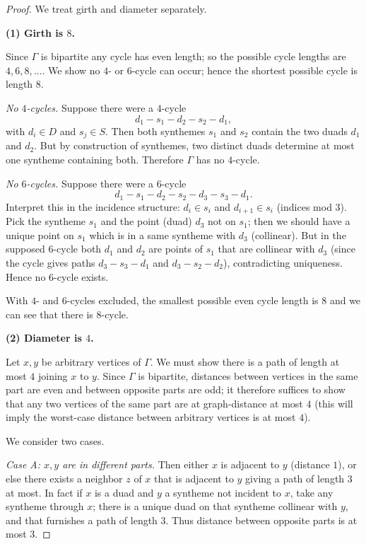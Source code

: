 \documentclass[12pt,a4paper,openany]{book}
\begin{document}
\begin{proof}
We treat girth and diameter separately.

\medskip\noindent\textbf{(1) Girth is $8$.}

Since $\Gamma$ is bipartite any cycle has even length; so the possible cycle lengths are $4,6,8,\dots$.
We show no $4$- or $6$-cycle can occur; hence the shortest possible cycle is length $8$.

\emph{No $4$-cycles.}  Suppose there were a $4$-cycle
\[
d_1 - s_1 - d_2 - s_2 - d_1,
\]
with $d_i\in D$ and $s_j\in S$. Then both synthemes $s_1$ and $s_2$ contain the two duads $d_1$ and $d_2$.  But by construction of synthemes, two distinct duads determine at most one syntheme containing both. Therefore $\Gamma$ has no $4$-cycle.

\emph{No $6$-cycles.}  Suppose there were a $6$-cycle
\[
d_1 - s_1 - d_2 - s_2 - d_3 - s_3 - d_1 .
\]
Interpret this in the incidence structure: $d_i\in s_{i}$ and $d_{i+1}\in s_{i}$ (indices mod \(3\)).  Pick the syntheme $s_1$ and the point (duad) $d_3$ not on $s_1$; then we should have a unique point on $s_1$ which is in a same syntheme with $d_3$ (collinear). But in the supposed $6$-cycle both $d_1$ and $d_2$ are points of $s_1$ that are collinear with $d_3$ (since the cycle gives paths $d_3-s_3-d_1$ and $d_3-s_2-d_2$), contradicting uniqueness. Hence no $6$-cycle exists.

With $4$- and $6$-cycles excluded, the smallest possible even cycle length is $8$ and we can see that there is 8-cycle.

\medskip\noindent\textbf{(2) Diameter is $4$.}

Let $x,y$ be arbitrary vertices of $\Gamma$. We must show there is a path of length at most $4$ joining $x$ to $y$. Since $\Gamma$ is bipartite, distances between vertices in the same part are even and between opposite parts are odd; it therefore suffices to show that any two vertices of the same part are at graph-distance at most $4$ (this will imply the worst-case distance between arbitrary vertices is at most $4$).

We consider two cases.

\emph{Case A: $x,y$ are in different parts.} Then either $x$ is adjacent to $y$ (distance $1$), or else there exists a neighbor $z$ of $x$ that is adjacent to $y$ giving a path of length $3$ at most. In fact if $x$ is a duad and $y$ a syntheme not incident to $x$, take any syntheme through $x$;  there is a unique duad on that syntheme collinear with $y$, and that furnishes a path of length $3$. Thus distance between opposite parts is at most $3$.


\end{proof}
\end{document}
